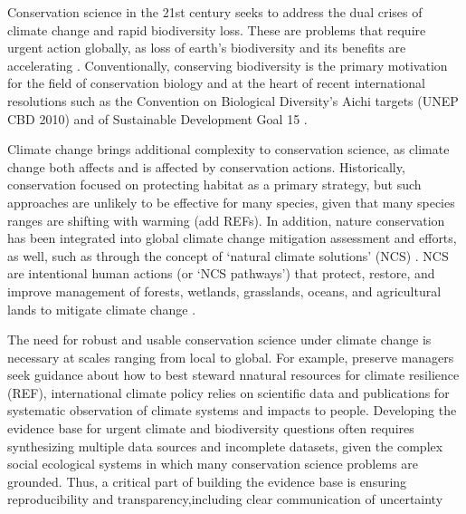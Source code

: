 \documentclass{article}
\begin{document}
\par Conservation science in the 21st century seeks to address the dual crises of  climate change and rapid biodiversity loss. These are problems that require urgent action globally, as loss of earth's biodiversity and its benefits are accelerating \citep{brondizio2019assessing, ripple2017extinction,tittensor2014mid}. Conventionally, conserving biodiversity is the primary motivation for the field of conservation biology \citep{williams2020past} and at the heart of recent international resolutions such as the Convention on Biological Diversity's Aichi targets (UNEP CBD 2010) and of Sustainable Development Goal 15 \citep{assembly2015resolution}. 
\par Climate change brings additional complexity to conservation science, as climate change both affects and is affected by conservation actions. Historically, conservation focused on protecting habitat as a primary strategy, but such approaches are unlikely to be effective for many species, given that many species ranges are shifting with warming (add REFs). In addition, nature conservation has been integrated into global climate change mitigation assessment and efforts, as well, such as through the concept of `natural climate solutions’ (NCS) \citep{ellis2024principles}. NCS are intentional human actions (or `NCS pathways') that protect, restore, and improve management of forests, wetlands, grasslands, oceans, and agricultural lands to mitigate climate change \citep{griscom2017natural}.

\par The need for robust and usable conservation science under climate change is necessary at scales ranging from local to global. For example, preserve managers seek guidance about how to best steward nnatural resources for climate resilience (REF), international climate policy relies on scientific data and publications for systematic observation of climate systems and impacts to people. Developing the evidence base for urgent climate and biodiversity questions often requires synthesizing multiple data sources and incomplete datasets, given the complex social ecological systems in which many conservation science problems are grounded. Thus, a critical part of building the evidence base is ensuring reproducibility and transparency,including clear communication of uncertainty \citep{ellis2024principles,ipcc2007} 
\end{document}
